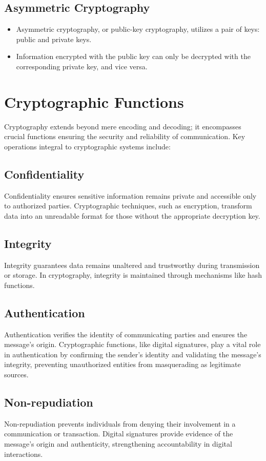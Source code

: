 \documentclass[11pt]{article}
\begin{document}
\subsection*{Asymmetric Cryptography}
\begin{itemize}
    \item Asymmetric cryptography, or public-key cryptography, utilizes a pair of keys: public and private keys.
    \item Information encrypted with the public key can only be decrypted with the corresponding private key, and vice versa.
\end{itemize}

\section*{Cryptographic Functions}
Cryptography extends beyond mere encoding and decoding; it encompasses crucial functions ensuring the security and reliability of communication. Key operations integral to cryptographic systems include:

\subsection*{Confidentiality}
Confidentiality ensures sensitive information remains private and accessible only to authorized parties. Cryptographic techniques, such as encryption, transform data into an unreadable format for those without the appropriate decryption key.

\subsection*{Integrity}
Integrity guarantees data remains unaltered and trustworthy during transmission or storage. In cryptography, integrity is maintained through mechanisms like hash functions.

\subsection*{Authentication}
Authentication verifies the identity of communicating parties and ensures the message's origin. Cryptographic functions, like digital signatures, play a vital role in authentication by confirming the sender's identity and validating the message's integrity, preventing unauthorized entities from masquerading as legitimate sources.

\subsection*{Non-repudiation}
Non-repudiation prevents individuals from denying their involvement in a communication or transaction. Digital signatures provide evidence of the message's origin and authenticity, strengthening accountability in digital interactions.
\end{document}
